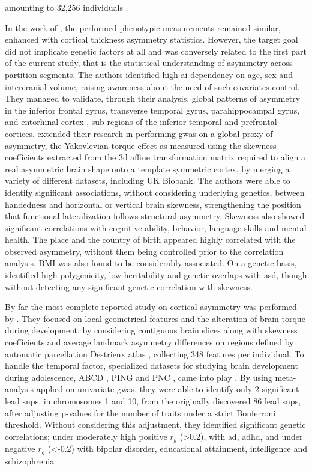 amounting to 32,256 individuals \cite{Littlejohns2020}.

In the work of \citet{Kong2018}, the performed phenotypic measurements remained similar, enhanced with cortical thickness asymmetry statistics. However, the target goal did not implicate genetic factors at all and was conversely related to the first part of the current study, that is the statistical understanding of asymmetry across partition segments. The authors identified high \ac{ai} dependency on age, sex and intercranial volume, raising awareness about the need of such covariates control. They managed to validate, through their analysis, global patterns of asymmetry in the inferior frontal gyrus, transverse temporal gyrus, parahippocampal gyrus, and entorhinal cortex \cite{Kong2018}, sub-regions of the inferior temporal and prefrontal cortices. \citet{Kong2021} extended their research in performing \ac{gwas} on a global proxy of asymmetry, the Yakovlevian torque effect as measured using the skewness coefficients extracted from the \ac{3d} affine transformation matrix required to align a real asymmetric brain shape onto a template symmetric cortex, by merging a variety of different datasets, including UK Biobank. The authors were able to identify significant associations, without considering underlying genetics, between handedness and horizontal or vertical brain skewness, strengthening the position that functional lateralization follows structural asymmetry. Skewness also showed significant correlations with cognitive ability, behavior, language skills and mental health. The place and the country of birth appeared highly correlated with the observed asymmetry, without them being controlled prior to the correlation analysis. BMI was also found to be considerably associated. On a genetic basis, \citet{Kong2021} identified high polygenicity, low heritability and genetic overlaps with \ac{asd}, though without detecting any significant genetic correlation with skewness. 

By far the most complete reported study on cortical asymmetry was performed  by \citet{Zhao2022}. They focused on local geometrical features and the alteration of brain torque during development, by considering contiguous brain slices along with skewness coefficients and average landmark asymmetry differences on regions defined by automatic parcellation Destrieux atlas \cite{Destrieux2010}, collecting 348 features per individual. To handle the temporal factor, specialized datasets for studying brain development during adolescence, ABCD \cite{Volkow2018}, PING \cite{Jernigan2016} and PNC \cite{Satterthwaite2016}, came into play \cite{Zhao2022}. By using meta-analysis applied on univariate \ac{gwas}, they were able to identify only 2 significant lead \acp{snp}, in chromosomes 1 and 10,  from the originally discovered 86 lead \acp{snp}, after adjusting p-values for the number of traits under a strict Bonferroni threshold. Without considering this adjustment, they identified significant genetic correlations; under  moderately high positive $r_g$ (>0.2), with \ac{ad}, \ac{adhd}, and under negative $r_g$ (<-0.2) with bipolar disorder, educational attainment, intelligence and schizophrenia \cite{Zhao2022}. 

